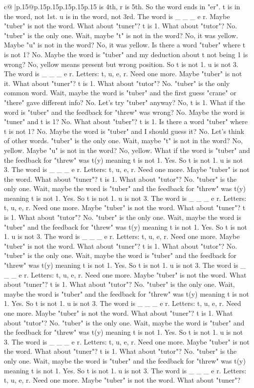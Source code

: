 \documentclass{article}
\begin{document}
{\begin{supertabular}{c@{$\;$}|p{.15\linewidth}@{}p{.15\linewidth}p{.15\linewidth}p{.15\linewidth}p{.15\linewidth}p{.15\linewidth}}
{{{is 4th, r is 5th. So the word ends in "er". t is in the word, not 1st. u is in the word, not 3rd. The word is \_ \_ \_ e r. Maybe "tuber" is not the word. What about "tuner"? t is 1. What about "tutor"? No. "tuber" is the only one. Wait, maybe "t" is not in the word? No, it was yellow. Maybe "u" is not in the word? No, it was yellow. Is there a word "tuber" where t is not 1? No. Maybe the word is "tuber" and my deduction about t not being 1 is wrong? No, yellow means present but wrong position. So t is not 1. u is not 3. The word is \_ \_ \_ e r. Letters: t, u, e, r. Need one more. Maybe "tuber" is not it. What about "tuner"? t is 1. What about "tutor"? No. "tuber" is the only common word. Wait, maybe the word is "tuber" and the first guess "crane" or "there" gave different info? No. Let's try "tuber" anyway? No, t is 1. What if the word is "tuber" and the feedback for "threw" was wrong? No. Maybe the word is "tuner" and t is 1? No. What about "tuber"? t is 1. Is there a word "tuber" where t is not 1? No. Maybe the word is "tuber" and I should guess it? No. Let's think of other words. "tuber" is the only one. Wait, maybe "t" is not in the word? No, yellow. Maybe "u" is not in the word? No, yellow. What if the word is "tuber" and the feedback for "threw" was t(y) meaning t is not 1. Yes. So t is not 1. u is not 3. The word is \_ \_ \_ e r. Letters: t, u, e, r. Need one more. Maybe "tuber" is not the word. What about "tuner"? t is 1. What about "tutor"? No. "tuber" is the only one. Wait, maybe the word is "tuber" and the feedback for "threw" was t(y) meaning t is not 1. Yes. So t is not 1. u is not 3. The word is \_ \_ \_ e r. Letters: t, u, e, r. Need one more. Maybe "tuber" is not the word. What about "tuner"? t is 1. What about "tutor"? No. "tuber" is the only one. Wait, maybe the word is "tuber" and the feedback for "threw" was t(y) meaning t is not 1. Yes. So t is not 1. u is not 3. The word is \_ \_ \_ e r. Letters: t, u, e, r. Need one more. Maybe "tuber" is not the word. What about "tuner"? t is 1. What about "tutor"? No. "tuber" is the only one. Wait, maybe the word is "tuber" and the feedback for "threw" was t(y) meaning t is not 1. Yes. So t is not 1. u is not 3. The word is \_ \_ \_ e r. Letters: t, u, e, r. Need one more. Maybe "tuber" is not the word. What about "tuner"? t is 1. What about "tutor"? No. "tuber" is the only one. Wait, maybe the word is "tuber" and the feedback for "threw" was t(y) meaning t is not 1. Yes. So t is not 1. u is not 3. The word is \_ \_ \_ e r. Letters: t, u, e, r. Need one more. Maybe "tuber" is not the word. What about "tuner"? t is 1. What about "tutor"? No. "tuber" is the only one. Wait, maybe the word is "tuber" and the feedback for "threw" was t(y) meaning t is not 1. Yes. So t is not 1. u is not 3. The word is \_ \_ \_ e r. Letters: t, u, e, r. Need one more. Maybe "tuber" is not the word. What about "tuner"? t is 1. What about "tutor"? No. "tuber" is the only one. Wait, maybe the word is "tuber" and the feedback for "threw" was t(y) meaning t is not 1. Yes. So t is not 1. u is not 3. The word is \_ \_ \_ e r. Letters: t, u, e, r. Need one more. Maybe "tuber" is not the word. What about "tuner"? }}}
\end{supertabular}}
\end{document}
